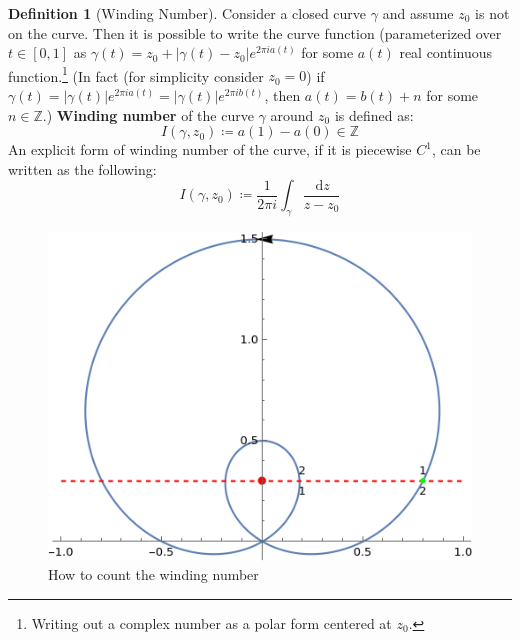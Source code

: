 \documentclass[a4paper, 12pt]{article}
\theoremstyle{definition}
\newtheorem{definition}{Definition}
\numberwithin{theorem}{section}
\numberwithin{definition}{section}
\numberwithin{exercise}{section}
\numberwithin{remark}{section}
\numberwithin{figure}{section}
\numberwithin{example}{section}
\newcommand{\intd}{\,\text{d}}
\begin{document}
\begin{definition}[Winding Number]
    Consider a closed curve $\gamma$ and assume $z_0$ is not on the curve.
    Then it is possible to write the curve function (parameterized over $t \in \left[ 0, 1 \right]$ as $\gamma(t) = z_0 + |\gamma(t) - z_0|e^{2\pi i a(t)}$ for some $a(t)$ real continuous function.\footnote{Writing out a complex number as a polar form centered at $z_0$.}
        (In fact (for simplicity consider $z_0 = 0$) if $\gamma(t) = |\gamma(t)|e^{2\pi i a(t)} =|\gamma(t)|e^{2\pi i b(t)} $, then $a(t) = b(t) + n$ for some $n \in \mathbb{Z}$.)
        \textbf{Winding number} of the curve $\gamma$ around $z_0$ is defined as:
    \begin{equation*}
        I\left( \gamma, z_0 \right) \coloneqq a(1) - a(0) \in \mathbb{Z}
    \end{equation*}
    An explicit form of winding number of the curve, if it is piecewise $C^1$, can be written as the following:
    \begin{equation*}
        I\left( \gamma, z_0 \right) \coloneqq \frac{1}{2\pi i} \int_{\gamma} \frac{\intd z}{z - z_0}
    \end{equation*}
    \begin{figure}[tbp]
        \centering
        \includegraphics{windingNumber}
        \caption{How to count the winding number}
        \label{fig: Winding Number}
    \end{figure}
\end{definition}
\end{document}
